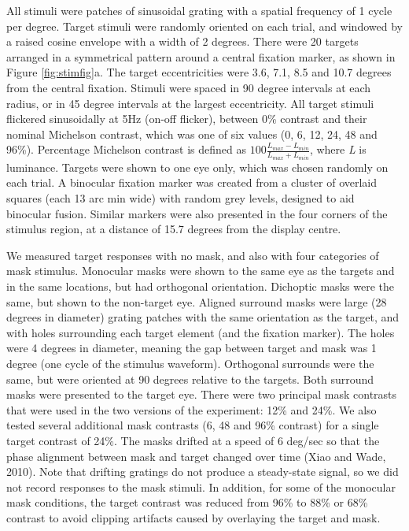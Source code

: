 \documentclass[]{article}
\begin{document}
All stimuli were patches of sinusoidal grating with a spatial frequency of 1 cycle per degree. Target stimuli were randomly oriented on each trial, and windowed by a raised cosine envelope with a width of 2 degrees. There were 20 targets arranged in a symmetrical pattern around a central fixation marker, as shown in Figure \ref{fig:stimfig}a. The target eccentricities were 3.6, 7.1, 8.5 and 10.7 degrees from the central fixation. Stimuli were spaced in 90 degree intervals at each radius, or in 45 degree intervals at the largest eccentricity. All target stimuli flickered sinusoidally at 5Hz (on-off flicker), between 0\% contrast and their nominal Michelson contrast, which was one of six values (0, 6, 12, 24, 48 and 96\%). Percentage Michelson contrast is defined as \(100\frac{L_{max}-L_{min}}{L_{max}+L_{min}}\), where \emph{L} is luminance. Targets were shown to one eye only, which was chosen randomly on each trial. A binocular fixation marker was created from a cluster of overlaid squares (each 13 arc min wide) with random grey levels, designed to aid binocular fusion. Similar markers were also presented in the four corners of the stimulus region, at a distance of 15.7 degrees from the display centre.

We measured target responses with no mask, and also with four categories of mask stimulus. Monocular masks were shown to the same eye as the targets and in the same locations, but had orthogonal orientation. Dichoptic masks were the same, but shown to the non-target eye. Aligned surround masks were large (28 degrees in diameter) grating patches with the same orientation as the target, and with holes surrounding each target element (and the fixation marker). The holes were 4 degrees in diameter, meaning the gap between target and mask was 1 degree (one cycle of the stimulus waveform). Orthogonal surrounds were the same, but were oriented at 90 degrees relative to the targets. Both surround masks were presented to the target eye. There were two principal mask contrasts that were used in the two versions of the experiment: 12\% and 24\%. We also tested several additional mask contrasts (6, 48 and 96\% contrast) for a single target contrast of 24\%. The masks drifted at a speed of 6 deg/sec so that the phase alignment between mask and target changed over time (Xiao and Wade, 2010). Note that drifting gratings do not produce a steady-state signal, so we did not record responses to the mask stimuli. In addition, for some of the monocular mask conditions, the target contrast was reduced from 96\% to 88\% or 68\% contrast to avoid clipping artifacts caused by overlaying the target and mask.
\end{document}
